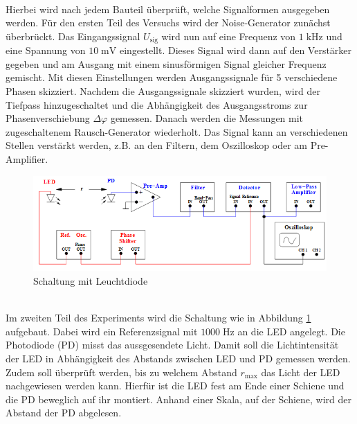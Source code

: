 \\
Hierbei wird nach jedem Bauteil überprüft, welche Signalformen ausgegeben werden.
Für den ersten Teil des Versuchs wird der Noise-Generator zunächst überbrückt.
Das Eingangssignal $U_\text{sig}$ wird nun auf eine Frequenz von $1\;\si{\kilo\hertz}$
und eine Spannung von $10\;\si{\milli\volt}$ eingestellt. Dieses Signal wird dann
auf den Verstärker gegeben und am Ausgang mit einem sinusförmigen Signal gleicher
Frequenz gemischt. Mit diesen Einstellungen werden Ausgangssignale für 5 verschiedene
Phasen skizziert.
Nachdem die Ausgangssignale skizziert wurden, wird der Tiefpass hinzugeschaltet
und die Abhängigkeit des Ausgangsstroms zur Phasenverschiebung
$\Delta\varphi$ gemessen.
Danach werden die Messungen mit zugeschaltenem Rausch-Generator wiederholt. Das Signal
kann an verschiedenen Stellen verstärkt werden, z.B. an den Filtern, dem Oszilloskop
oder am Pre-Amplifier.
\\
\begin{figure}
  \centering
  \includegraphics[width=\textwidth]{Bilder/LEDSchaltung.jpg}
  \caption{Schaltung mit Leuchtdiode \cite{303}}
  \label{fig:LED}
\end{figure}  %
\\
Im zweiten Teil des Experiments wird die Schaltung wie in Abbildung \ref{fig:LED}
aufgebaut. Dabei wird ein Referenzsignal mit $1000 \;\si{\hertz}$ an die LED angelegt.
Die Photodiode (PD) misst das aussgesendete Licht.
Damit soll die Lichtintensität der LED in Abhängigkeit des Abstands
zwischen LED und PD gemessen werden. Zudem soll überprüft werden, bis zu welchem
Abstand $r_\text{max}$ das Licht der LED nachgewiesen werden kann. Hierfür
ist die LED fest am Ende einer Schiene und die PD beweglich auf ihr montiert.
Anhand einer Skala, auf der Schiene, wird der Abstand der PD abgelesen.
\newpage

